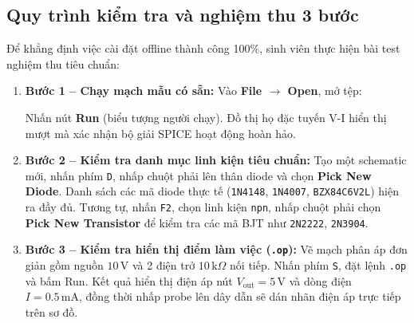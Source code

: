 \documentclass[12pt,a4paper]{article}
\begin{document}
\subsection{Quy trình kiểm tra và nghiệm thu 3 bước}
Để khẳng định việc cài đặt offline thành công 100\%, sinh viên thực hiện bài test nghiệm thu tiêu chuẩn:
\begin{enumerate}[itemsep=2pt]
  \item \textbf{Bước 1 -- Chạy mạch mẫu có sẵn:} Vào \textbf{File $\rightarrow$ Open}, mở tệp:
  \begin{center}
  \end{center}
  Nhấn nút \textbf{Run} (biểu tượng người chạy). Đồ thị họ đặc tuyến V-I hiển thị mượt mà xác nhận bộ giải SPICE hoạt động hoàn hảo.
  \item \textbf{Bước 2 -- Kiểm tra danh mục linh kiện tiêu chuẩn:} Tạo một schematic mới, nhấn phím \texttt{D}, nhấp chuột phải lên thân diode và chọn \textbf{Pick New Diode}. Danh sách các mã diode thực tế (\texttt{1N4148}, \texttt{1N4007}, \texttt{BZX84C6V2L}) hiện ra đầy đủ. Tương tự, nhấn \texttt{F2}, chọn linh kiện \texttt{npn}, nhấp chuột phải chọn \textbf{Pick New Transistor} để kiểm tra các mã BJT như \texttt{2N2222}, \texttt{2N3904}.
  \item \textbf{Bước 3 -- Kiểm tra hiển thị điểm làm việc (\texttt{.op}):} Vẽ mạch phân áp đơn giản gồm nguồn $10\,\text{V}$ và 2 điện trở $10\,\text{k}\Omega$ nối tiếp. Nhấn phím \texttt{S}, đặt lệnh \texttt{.op} và bấm Run. Kết quả hiển thị điện áp nút $V_{\text{out}} = 5\,\text{V}$ và dòng điện $I = 0.5\,\text{mA}$, đồng thời nhấp probe lên dây dẫn sẽ dán nhãn điện áp trực tiếp trên sơ đồ.
\end{enumerate}
\end{document}
